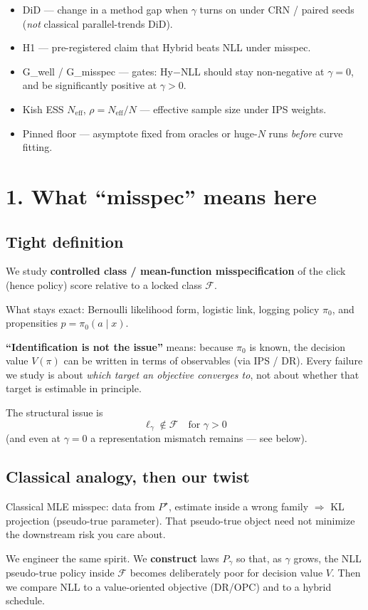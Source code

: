 \documentclass[11pt]{article}
\newcommand{\phonesection}[1]{\Needspace{8\baselineskip}\section*{#1}}
\newcommand{\phonesub}[1]{\Needspace{6\baselineskip}\subsection*{#1}}
\newcommand{\Neff}{N_{\mathrm{eff}}}
\begin{document}
\begin{itemize}
  \item DiD --- change in a method gap when
        $\gamma$ turns on under CRN / paired
        seeds (\emph{not} classical
        parallel-trends DiD).
  \item H1 --- pre-registered claim that
        Hybrid beats NLL under misspec.
  \item G\_well / G\_misspec --- gates:
        Hy$-$NLL should stay non-negative at
        $\gamma{=}0$, and be significantly
        positive at $\gamma{>}0$.
  \item Kish ESS $\Neff$, $\rho=\Neff/N$ ---
        effective sample size under IPS
        weights.
  \item Pinned floor --- asymptote fixed
        from oracles or huge-$N$ runs
        \emph{before} curve fitting.
\end{itemize}

\phonesection{1. What ``misspec'' means here}

\phonesub{Tight definition}
We study \textbf{controlled class / mean-function
misspecification} of the click (hence policy)
score relative to a locked class $\mathcal{F}$.

What stays exact: Bernoulli likelihood form,
logistic link, logging policy $\pi_{0}$, and
propensities $p=\pi_{0}(a\mid x)$.

\textbf{``Identification is not the issue''}
means: because $\pi_{0}$ is known, the
decision value $V(\pi)$ can be written in
terms of observables (via IPS / DR).  Every
failure we study is about \emph{which target
an objective converges to}, not about whether
that target is estimable in principle.

The structural issue is
\[
\ell_{\gamma}\notin\mathcal{F}
\quad\text{for }\gamma>0
\]
(and even at $\gamma{=}0$ a representation
mismatch remains --- see below).

\phonesub{Classical analogy, then our twist}
Classical MLE misspec: data from $P^{\star}$,
estimate inside a wrong family $\Rightarrow$
KL projection (pseudo-true parameter).  That
pseudo-true object need not minimize the
downstream risk you care about.

We engineer the same spirit.  We
\textbf{construct} laws $P_{\gamma}$ so that,
as $\gamma$ grows, the NLL pseudo-true policy
inside $\mathcal{F}$ becomes deliberately
poor for decision value $V$.  Then we compare
NLL to a value-oriented objective (DR/OPC)
and to a hybrid schedule.
\end{document}
